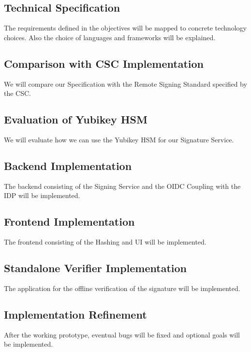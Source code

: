 \subsection{Technical Specification}\label{subsec:technical-specification}
The requirements defined in the objectives will be mapped to concrete technology choices.
Also the choice of languages and frameworks will be explained.

\subsection{Comparison with CSC Implementation}\label{subsec:comparison-with-csc-implementation}
We will compare our Specification with the Remote Signing Standard specified by the \gls{CSC}.

\subsection{Evaluation of Yubikey HSM}\label{subsec:evaluation-of-yubikey-hsm}
We will evaluate how we can use the Yubikey HSM for our Signature Service.

\subsection{Backend Implementation}\label{subsec:backend-implementation}
The backend consisting of the Signing Service and the OIDC Coupling with the IDP will be implemented.

\subsection{Frontend Implementation}\label{subsec:frontend-implementation}
The frontend consisting of the Hashing and UI will be implemented.

\subsection{Standalone Verifier Implementation}\label{subsec:standalone-verifier-implementation}
The application for the offline verification of the signature will be implemented.

\subsection{Implementation Refinement}\label{subsec:implementation-refinement}
After the working prototype, eventual bugs will be fixed and optional goals will be implemented.

